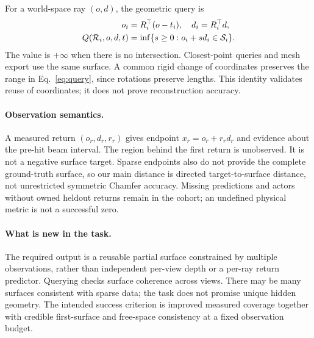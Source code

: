 For a world-space ray $(o,d)$, the geometric query is
\begin{align}
 o_i&=R_i^\top(o-t_i),\quad d_i=R_i^\top d,\\
 Q(\mathcal R_i,o,d,t)&=\inf\{s\geq0:o_i+s d_i\in\mathcal S_i\}.
 \label{eq:query}
\end{align}
The value is $+\infty$ when there is no intersection. Closest-point queries and mesh export use the same surface. A common rigid change of coordinates preserves the range in Eq.~\ref{eq:query}, since rotations preserve lengths. This identity validates reuse of coordinates; it does not prove reconstruction accuracy.

\paragraph{Observation semantics.}
A measured return $(o_r,d_r,r_r)$ gives endpoint $x_r=o_r+r_rd_r$ and evidence about the pre-hit beam interval. The region behind the first return is unobserved. It is not a negative surface target. Sparse endpoints also do not provide the complete ground-truth surface, so our main distance is directed target-to-surface distance, not unrestricted symmetric Chamfer accuracy. Missing predictions and actors without owned heldout returns remain in the cohort; an undefined physical metric is not a successful zero.

\paragraph{What is new in the task.}
The required output is a reusable partial surface constrained by multiple observations, rather than independent per-view depth or a per-ray return predictor. Querying checks surface coherence across views. There may be many surfaces consistent with sparse data; the task does not promise unique hidden geometry. The intended success criterion is improved measured coverage together with credible first-surface and free-space consistency at a fixed observation budget.
